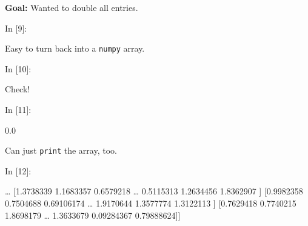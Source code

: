     \textbf{Goal:} Wanted to double all entries.

    \begin{BGVerbatim}[commandchars=\\\{\}]
{\color{incolor}In [{\color{incolor}9}]:}   
\end{BGVerbatim}

    Easy to turn back into a \texttt{numpy} array.

    \begin{BGVerbatim}[commandchars=\\\{\}]
{\color{incolor}In [{\color{incolor}10}]:}   
\end{BGVerbatim}

    Check!

    \begin{BGVerbatim}[commandchars=\\\{\}]
{\color{incolor}In [{\color{incolor}11}]:} 
         
           
\end{BGVerbatim}

    \begin{BGVerbatim}[commandchars=\\\{\}]
0.0

    \end{BGVerbatim}

    Can just \texttt{print} the array, too.

    \begin{BGVerbatim}[commandchars=\\\{\}]
{\color{incolor}In [{\color{incolor}12}]:} 
\end{BGVerbatim}

    \begin{BGVerbatim}[commandchars=\\\{\}]
[[1.9884549  1.9853095  0.17914777 {\ldots} 1.6878643  1.0856574  0.5063481 ]
 [0.8978882  0.8065957  1.718012   {\ldots} 1.2990425  1.3980168  0.02950122]
 [0.9073179  0.20164105 1.8345034  {\ldots} 1.777128   1.6947111  1.7179842 ]
 {\ldots}
 [1.3738339  1.1683357  0.6579218  {\ldots} 0.5115313  1.2634456  1.8362907 ]
 [0.9982358  0.7504688  0.69106174 {\ldots} 1.9170644  1.3577774  1.3122113 ]
 [0.7629418  0.7740215  1.8698179  {\ldots} 1.3633679  0.09284367 0.79888624]]

    \end{BGVerbatim}

